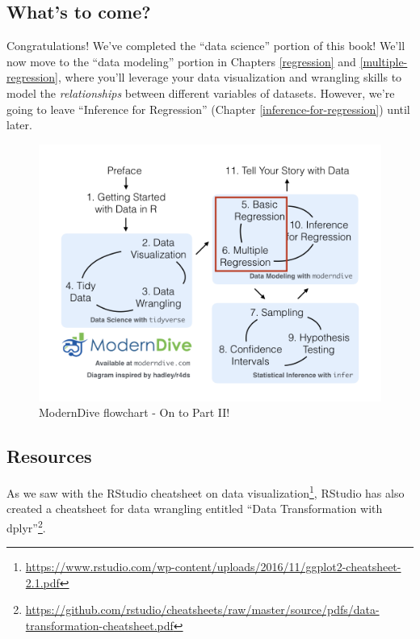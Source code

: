 \documentclass[12pt,]{krantz}
\renewcommand{\href}[2]{#2\footnote{\url{#1}}}
\theoremstyle{definition}
\theoremstyle{definition}
\theoremstyle{definition}
\theoremstyle{remark}
\begin{document}
\subsection{What's to come?}\label{whats-to-come-3}

Congratulations! We've completed the ``data science'' portion of this
book! We'll now move to the ``data modeling'' portion in Chapters
\ref{regression} and \ref{multiple-regression}, where you'll leverage
your data visualization and wrangling skills to model the
\emph{relationships} between different variables of datasets. However,
we're going to leave ``Inference for Regression'' (Chapter
\ref{inference-for-regression}) until later.

\begin{figure}

{\centering \includegraphics[width=\textwidth]{images/flowcharts/flowchart/flowchart.005} 

}

\caption{ModernDive flowchart - On to Part II!}\label{fig:unnamed-chunk-158}
\end{figure}

\subsection{Resources}\label{resources-1}

As we saw with the RStudio cheatsheet on
\href{https://www.rstudio.com/wp-content/uploads/2016/11/ggplot2-cheatsheet-2.1.pdf}{data
visualization}, RStudio has also created a cheatsheet for data wrangling
entitled
\href{https://github.com/rstudio/cheatsheets/raw/master/source/pdfs/data-transformation-cheatsheet.pdf}{``Data
Transformation with dplyr''}.
\end{document}
